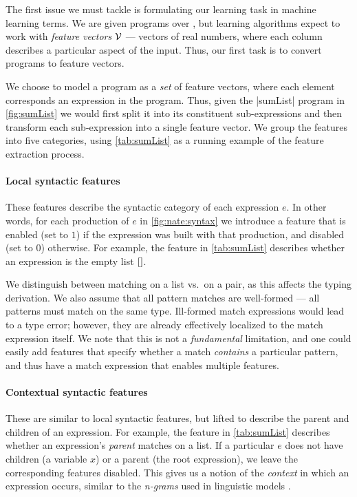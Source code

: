 The first issue we must tackle is formulating our learning task in
machine learning terms.
%
We are given programs over \lang, but learning algorithms expect to work
with \emph{feature vectors} $\mathcal{V}$ --- vectors of real numbers, where each
column describes a particular aspect of the input.
%
Thus, our first task is to convert programs to feature vectors.

We choose to model a program as a \emph{set} of feature vectors, where
each element corresponds an expression in the program.
%
Thus, given the |sumList| program in \autoref{fig:sumList} we
would first split it into its constituent sub-expressions and then
transform each sub-expression into a single feature vector.
%
We group the features into five categories, using \autoref{tab:sumList}
as a running example of the feature extraction process.

\paragraph{Local syntactic features}
These features describe the syntactic category of each expression $e$.
%
In other words, for each production of $e$ in \autoref{fig:nate:syntax} we
introduce a feature that is enabled (set to $1$) if the expression was
built with that production, and disabled (set to $0$) otherwise.
%
For example, the \IsNil feature in \autoref{tab:sumList} describes
whether an expression is the empty list $\mathtt{[]}$.

We distinguish between matching on a list vs.\ on a pair, as this
affects the typing derivation.
%
We also assume that all pattern matches are well-formed --- \ie all
patterns must match on the same type.
%
Ill-formed match expressions would lead to a type error; however, they
are already effectively localized to the match expression itself.
%
We note that this is not a \emph{fundamental} limitation, and one could
easily add features that specify whether a match \emph{contains} a
particular pattern, and thus have a match expression that enables multiple
features.

\paragraph{Contextual syntactic features}
These are similar to local syntactic features, but lifted to describe the
parent and children of an expression.
%
For example, the \IsCaseListP feature in \autoref{tab:sumList} describes
whether an expression's \emph{parent} matches on a list.
%
If a particular $e$ does not have children (\eg a variable $x$) or a
parent (\ie the root expression), we leave the corresponding features
disabled.
%
This gives us a notion of the \emph{context} in which an expression
occurs, similar to the \emph{n-grams} used in linguistic
models \citep{Hindle2012-hf,Gabel2010-el}.


